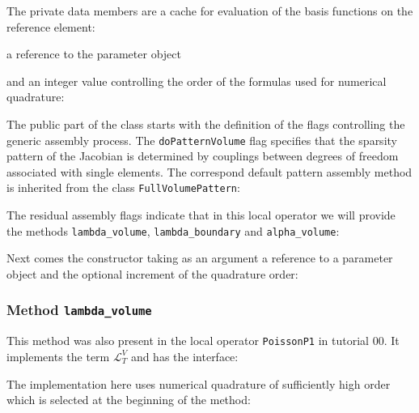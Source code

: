 \documentclass[a4paper,12pt]{article}
\begin{document}
The private data members are a cache for evaluation of the basis functions
on the reference element:

a reference to the parameter object

and an integer value controlling the order of the formulas used for numerical quadrature:


The public part of the class starts with the definition of the flags controlling
the generic assembly process. The \lstinline{doPatternVolume} flag
specifies that the sparsity pattern of the Jacobian is determined by couplings
between degrees of freedom associated with single elements. The correspond
default pattern assembly method is inherited from the class \lstinline{FullVolumePattern}:


The residual assembly flags indicate that in this local operator we will provide
the methods \lstinline{lambda_volume}, \lstinline{lambda_boundary}
and \lstinline{alpha_volume}:


Next comes the constructor taking as an argument a reference to a
parameter object and the optional increment of the quadrature order:


\subsubsection*{Method \lstinline{lambda_volume}}

This method was also present in the local operator \lstinline{PoissonP1}
in tutorial 00. It implements the term $\mathcal{L}_T^V$ and has the interface:


The implementation here uses numerical quadrature of sufficiently high order
which is selected at the beginning of the method:

\end{document}
